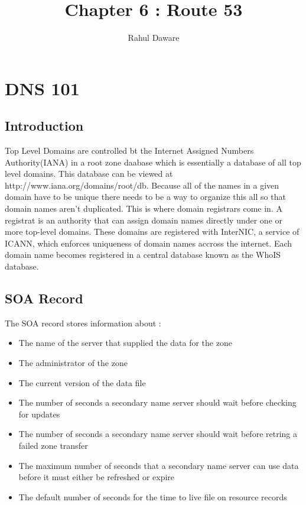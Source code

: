 \documentclass{article}
\author{Rahul Daware}
\begin{document}
\title{Chapter 6 : Route 53}
\maketitle
\newpage
\tableofcontents
\newpage

\section{DNS 101}

\subsection{Introduction}
Top Level Domains are controlled bt the Internet Assigned Numbers Authority(IANA) in a root zone daabase which is essentially a database of all top level domains. This database can be viewed at http://www.iana.org/domains/root/db. Because all of the names in a given domain have to be unique there needs to be a way to organize this all so that domain names aren't duplicated. This is where domain registrars come in. A registrat is an authority that can assign domain names directly under one or more top-level domains. These domains are registered with InterNIC, a service of ICANN, which enforces uniqueness of domain names accross the internet. Each domain name becomes registered in a central database known as the WhoIS database. \\

\subsection{SOA Record}
The SOA record stores information about :
\begin{itemize}
\item
The name of the server that supplied the data for the zone

\item
The administrator of the zone

\item
The current version of the data file

\item
The number of seconds a secondary name server should wait before checking for updates

\item
The number of seconds a secondary name server should wait before retring a failed zone transfer

\item
The maximum number of seconds that a secondary name server can use data before it must either be refreshed or expire

\item
The default number of seconds for the time to live file on resource records
\end{itemize}
\end{document}
